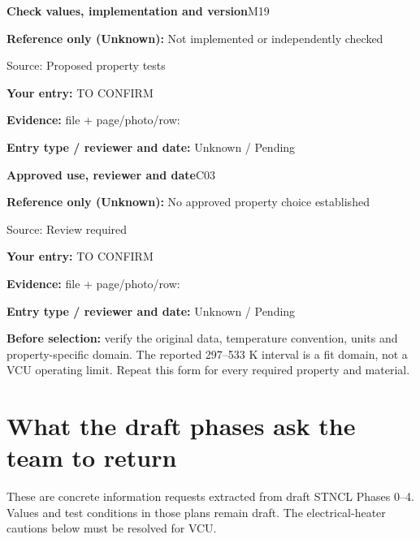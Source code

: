 \documentclass[11pt]{article}
\newcommand{\notebox}[1]{\par\noindent\colorbox{pale}{\parbox{\dimexpr\linewidth-2\fboxsep\relax}{#1}}\par}
\begin{document}
\par\noindent\begin{minipage}{\textwidth}\small
{\color{navy}\bfseries Check values, implementation and version}\hfill M19\par
\colorbox{pale}{\parbox{\dimexpr\linewidth-2\fboxsep\relax}{
\textbf{Reference only (Unknown):} Not implemented or independently checked\par
{\footnotesize Source: Proposed property tests}}}\par
\textbf{Your entry:} {\color{muted}TO CONFIRM}\enspace\hrulefill\par
{\footnotesize\textbf{Evidence:} file + page/photo/row: \hrulefill\par
\textbf{Entry type / reviewer and date:} Unknown / Pending\par
}\end{minipage}\par\vspace{5pt}
\par\noindent\begin{minipage}{\textwidth}\small
{\color{navy}\bfseries Approved use, reviewer and date}\hfill C03\par
\colorbox{pale}{\parbox{\dimexpr\linewidth-2\fboxsep\relax}{
\textbf{Reference only (Unknown):} No approved property choice established\par
{\footnotesize Source: Review required}}}\par
\textbf{Your entry:} {\color{muted}TO CONFIRM}\enspace\hrulefill\par
{\footnotesize\textbf{Evidence:} file + page/photo/row: \hrulefill\par
\textbf{Entry type / reviewer and date:} Unknown / Pending\par
}\end{minipage}\par\vspace{5pt}
\notebox{\textbf{Before selection:} verify the original data, temperature convention, units and property-specific domain. The reported 297--533 K interval is a fit domain, not a VCU operating limit. Repeat this form for every required property and material.}
\clearpage\section{What the draft phases ask the team to return}\label{phase-requests}
These are concrete information requests extracted from draft STNCL Phases 0--4. Values and test conditions in those plans remain draft. The electrical-heater cautions below must be resolved for VCU.
\end{document}

